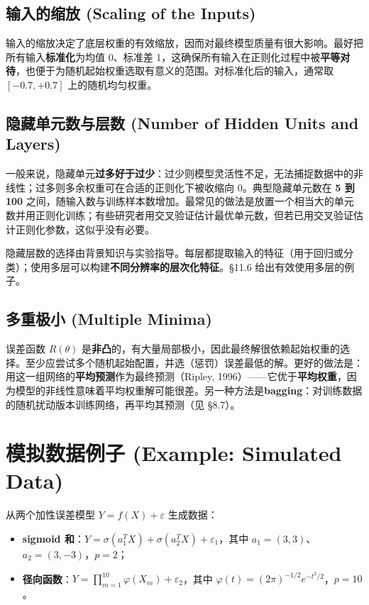 \subsection{输入的缩放 (Scaling of the Inputs)}

输入的缩放决定了底层权重的有效缩放，因而对最终模型质量有很大影响。最好把所有输入\textbf{标准化}为均值 0、标准差 1，这确保所有输入在正则化过程中被\textbf{平等对待}，也便于为随机起始权重选取有意义的范围。对标准化后的输入，通常取 $[-0.7, +0.7]$ 上的随机均匀权重。

\subsection{隐藏单元数与层数 (Number of Hidden Units and Layers)}

一般来说，隐藏单元\textbf{过多好于过少}：过少则模型灵活性不足，无法捕捉数据中的非线性；过多则多余权重可在合适的正则化下被收缩向 0。典型隐藏单元数在 \textbf{5 到 100} 之间，随输入数与训练样本数增加。最常见的做法是放置一个相当大的单元数并用正则化训练；有些研究者用交叉验证估计最优单元数，但若已用交叉验证估计正则化参数，这似乎没有必要。

隐藏层数的选择由背景知识与实验指导。每层都提取输入的特征（用于回归或分类）；使用多层可以构建\textbf{不同分辨率的层次化特征}。§11.6 给出有效使用多层的例子。

\subsection{多重极小 (Multiple Minima)}

误差函数 $R(\theta)$ 是\textbf{非凸}的，有大量局部极小，因此最终解很依赖起始权重的选择。至少应尝试多个随机起始配置，并选（惩罚）误差最低的解。更好的做法是：用这一组网络的\textbf{平均预测}作为最终预测（Ripley, 1996）——它优于\textbf{平均权重}，因为模型的非线性意味着平均权重解可能很差。另一种方法是\textbf{bagging}：对训练数据的随机扰动版本训练网络，再平均其预测（见 §8.7）。

\section{模拟数据例子 (Example: Simulated Data)}

从两个加性误差模型 $Y = f(X) + \varepsilon$ 生成数据：

\begin{itemize}
\item \textbf{sigmoid 和}：$Y = \sigma(a_1^T X) + \sigma(a_2^T X) + \varepsilon_1$，其中 $a_1=(3,3)$、$a_2=(3,-3)$，$p=2$；
\item \textbf{径向函数}：$Y = \prod_{m=1}^{10} \varphi(X_m) + \varepsilon_2$，其中 $\varphi(t) = (2\pi)^{-1/2} e^{-t^2/2}$，$p=10$。
\end{itemize}

